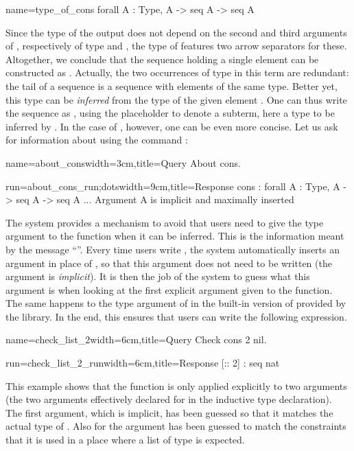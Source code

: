 \begin{coq}{name=type_of_cons}{}
  forall A : Type, A -> seq A -> seq A
\end{coq}
 Since the type of
the output does not depend on the second and third arguments of
, respectively of type  and , the type of
 features two arrow separators for these.
Altogether, we conclude
that the sequence holding a single element  can be
constructed as
. Actually, the two
occurrences of type  in this term are redundant: the tail of a
sequence is a sequence with elements of the same type. Better yet,
this type can be
\emph{inferred} from the type of the given element . One can
thus write the sequence as  , using the
placeholder \C{_} to
denote  a subterm, here a type to be inferred by \Coq{}.
In the case of , however,
one can be even more concise. Let us ask for
information about  using the command :

\begin{coq-left}{name=about_cons}{width=3cm,title=Query}
About cons.
$~$
$~$
\end{coq-left}
\begin{coqout-right}{run=about_cons_run;dots}{width=9cm,title=Response}
cons : forall A : Type, A -> seq A -> seq A
...
Argument A is implicit and maximally inserted
\end{coqout-right}

The \Coq{} system provides a mechanism to avoid that
users need to give the type argument to the  function when it
can be inferred.  This is
the information meant by the message ``''.  Every time users write , the system automatically
inserts an argument in place of , so that this argument does not
need to be written (the argument is {\em implicit}).  It is then the
job of the \Coq{} system to guess what this argument is when looking at
the first explicit argument given to the function.  The same happens
to the type argument of  in the built-in version of 
provided by the \mcbMC{} library.  In the end, this ensures that users can
write the following expression.

\begin{coq-left}{name=check_list_2}{width=6cm,title=Query}
Check cons 2 nil.
\end{coq-left}
\begin{coqout-right}{run=check_list_2_run}{width=6cm,title=Response}
[:: 2] : seq nat
\end{coqout-right}
\index[coq]{\C{(_ :: _)}}
This example shows that the function  is only applied
explicitly to two arguments (the two arguments effectively declared
for  in the inductive type declaration).
The first argument, which is implicit,
has been guessed so that it matches the actual type of .  Also for
 the argument has been guessed to match the constraints
that it is used in a place where a list of type  is expected.

